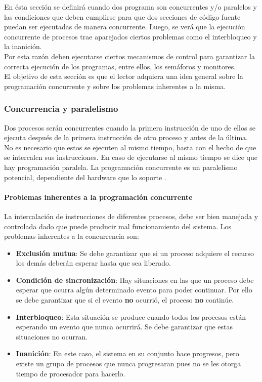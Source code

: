 \par En ésta sección se definirá cuando dos programa son concurrentes y/o paralelos y las condiciones que deben cumplirse para que dos secciones de código fuente puedan ser ejecutadas de manera concurrente. Luego, se verá que la ejecución concurrente de procesos trae aparejados ciertos problemas como el interbloqueo y la inanición.\\
Por esta razón deben ejecutarse ciertos mecanismos de control para garantizar la correcta ejecución de los programas, entre ellos, los semáforos y monitores.\\
El objetivo de esta sección es que el lector adquiera una idea general sobre la programación concurrente y sobre los problemas inherentes a la misma.

\subsubsection{Concurrencia y paralelismo}
Dos procesos serán concurrentes cuando la primera instrucción de uno de ellos se ejecuta después de la primera instrucción de otro proceso y antes de la última.
No es necesario que estos se ejecuten al mismo tiempo, basta con el hecho de que se intercalen sus instrucciones. En caso de ejecutarse al mismo tiempo se dice que hay programación paralela.
La programación concurrente es un paralelismo potencial, dependiente del hardware que lo soporte  \cite{mendez}.

\paragraph{Problemas inherentes a la programación concurrente}
La intercalación de instrucciones de diferentes procesos, debe ser bien manejada y controlada dado que puede producir mal funcionamiento del sistema. Los problemas inherentes a la concurrencia son:
\begin{itemize}
    \item \textbf{Exclusión mutua}: Se debe garantizar que si un proceso adquiere el recurso los demás deberán esperar hasta que sea liberado.

    \item \textbf{Condición de sincronización}: Hay situaciones en las que un proceso debe esperar que ocurra algún determinado evento para poder continuar. Por ello se debe garantizar que si el evento \textbf{no} ocurrió, el proceso \textbf{no} continúe. 
    
    \item \textbf{Interbloqueo}: Esta situación se produce cuando todos los procesos están esperando un evento que nunca ocurrirá. Se debe garantizar que estas situaciones no ocurran.
    
    \item \textbf{Inanición}: En este caso, el sistema en su conjunto hace progresos, pero existe un grupo de procesos que nunca progresaran pues no se les otorga tiempo de procesador para hacerlo.
\end{itemize}

